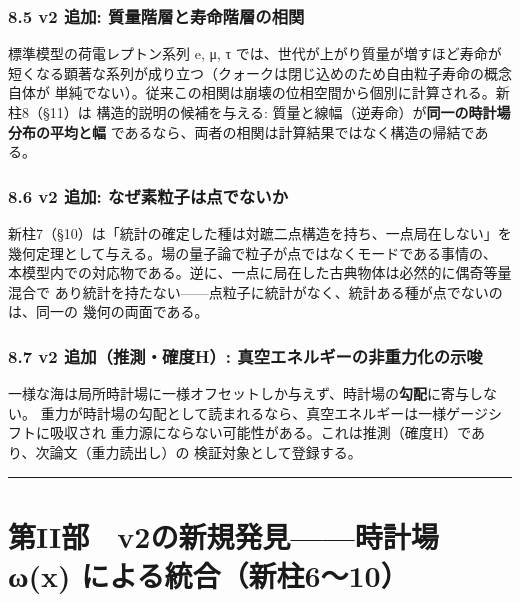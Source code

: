 \documentclass[
]{ltjarticle}
\begin{document}
\subsubsection{8.5 v2 追加:
質量階層と寿命階層の相関}\label{v2-ux8ffdux52a0-ux8ceaux91cfux968eux5c64ux3068ux5bffux547dux968eux5c64ux306eux76f8ux95a2}

標準模型の荷電レプトン系列 e, μ, τ
では、世代が上がり質量が増すほど寿命が
短くなる顕著な系列が成り立つ（クォークは閉じ込めのため自由粒子寿命の概念自体が
単純でない）。従来この相関は崩壊の位相空間から個別に計算される。新柱8（§11）は
構造的説明の候補を与える:
質量と線幅（逆寿命）が\textbf{同一の時計場分布の平均と幅}
であるなら、両者の相関は計算結果ではなく構造の帰結である。

\subsubsection{8.6 v2 追加:
なぜ素粒子は点でないか}\label{v2-ux8ffdux52a0-ux306aux305cux7d20ux7c92ux5b50ux306fux70b9ux3067ux306aux3044ux304b}

新柱7（§10）は「統計の確定した種は対蹠二点構造を持ち、一点局在しない」を
幾何定理として与える。場の量子論で粒子が点ではなくモードである事情の、
本模型内での対応物である。逆に、一点に局在した古典物体は必然的に偶奇等量混合で
あり統計を持たない------点粒子に統計がなく、統計ある種が点でないのは、同一の
幾何の両面である。

\subsubsection{8.7 v2 追加（推測・確度H）:
真空エネルギーの非重力化の示唆}\label{v2-ux8ffdux52a0ux63a8ux6e2cux78baux5ea6h-ux771fux7a7aux30a8ux30cdux30ebux30aeux30fcux306eux975eux91cdux529bux5316ux306eux793aux5506}

一様な海は局所時計場に一様オフセットしか与えず、時計場の\textbf{勾配}に寄与しない。
重力が時計場の勾配として読まれるなら、真空エネルギーは一様ゲージシフトに吸収され
重力源にならない可能性がある。これは推測（確度H）であり、次論文（重力読出し）の
検証対象として登録する。

\begin{center}\rule{0.5\linewidth}{0.5pt}\end{center}

\section{第II部　v2の新規発見------時計場 ω(x)
による統合（新柱6〜10）}\label{ux7b2ciiux90e8-v2ux306eux65b0ux898fux767aux898bux6642ux8a08ux5834-ux3c9x-ux306bux3088ux308bux7d71ux5408ux65b0ux67f1610}
\end{document}
